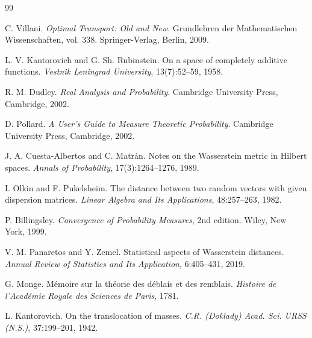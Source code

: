 \documentclass[11pt,a4paper]{article}
\theoremstyle{remark}
\begin{document}
\begin{thebibliography}{99}

  C. Villani. \textit{Optimal Transport: Old and New}. Grundlehren der Mathematischen Wissenschaften, vol. 338. Springer-Verlag, Berlin, 2009.

  L. V. Kantorovich and G. Sh. Rubinstein. On a space of completely additive functions. \textit{Vestnik Leningrad University}, 13(7):52--59, 1958.

  R. M. Dudley. \textit{Real Analysis and Probability}. Cambridge University Press, Cambridge, 2002.

  D. Pollard. \textit{A User's Guide to Measure Theoretic Probability}. Cambridge University Press, Cambridge, 2002.

  J. A. Cuesta-Albertos and C. Matrán. Notes on the Wasserstein metric in Hilbert spaces. \textit{Annals of Probability}, 17(3):1264--1276, 1989.

  I. Olkin and F. Pukelsheim. The distance between two random vectors with given dispersion matrices. \textit{Linear Algebra and Its Applications}, 48:257--263, 1982.

  P. Billingsley. \textit{Convergence of Probability Measures}, 2nd edition. Wiley, New York, 1999.

  V. M. Panaretos and Y. Zemel. Statistical aspects of Wasserstein distances. \textit{Annual Review of Statistics and Its Application}, 6:405--431, 2019.

  G. Monge. Mémoire sur la théorie des déblais et des remblais. \textit{Histoire de l'Académie Royale des Sciences de Paris}, 1781.

  L. Kantorovich. On the translocation of masses. \textit{C.R. (Doklady) Acad. Sci. URSS (N.S.)}, 37:199--201, 1942.
\end{thebibliography}
\end{document}
